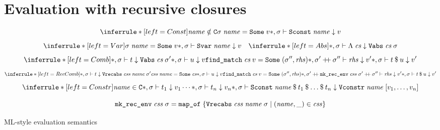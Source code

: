 
\section{Evaluation with recursive closures}
\label{sec:intermediate:ml}

\begin{code}[t]
  \[
    \inferrule*[left=Const]{\mathit{name} \notin \C \\ \sigma\;\mathit{name} = \holconst{Some}\;v}{\seval*{\sigma}{\holconst{Sconst}\;\mathit{name}}{v}}
  \]
  \[
    \inferrule*[left=Var]{\sigma\;\mathit{name} = \holconst{Some}\;v}{\seval*{\sigma}{\holconst{Svar}\;\mathit{name}}{v}} \quad
    \inferrule*[left=Abs]{ }{\seval*\sigma{\Lambda\;\cs}{\holconst{Vabs}\;\cs\;\sigma}}
  \]
  \[
    \inferrule*[left=Comb]{
      \seval*\sigma{t}{\holconst{Vabs}\;\cs\;\sigma'} \\
      \seval*\sigma{u}{v} \\
      \holconst{find\_match}\;\cs\;v = \holconst{Some}\;(\sigma'', \mathit{rhs}) \\
      \seval*{\envadd{\sigma'}{\sigma''}}{\mathit{rhs}}{v'}
    }{\seval*\sigma{\app t u}{v'}}
  \]
  \[
    \inferrule*[left=RecComb]{
      \seval*\sigma{t}{\holconst{Vrecabs}\;\css\;\mathit{name}\;\sigma'} \\
      \css\;\mathit{name} = \holconst{Some}\;\cs \\
      \seval*\sigma{u}{v} \\
      \holconst{find\_match}\;\cs\;v = \holconst{Some}\;(\sigma'', \mathit{rhs}) \\
      \seval*{\envadd{\sigma'}{\envadd{\holconst{mk\_rec\_env}\;\mathit{css}\;\sigma'}{\sigma''}}}{\mathit{rhs}}{v'}
    }{\seval*\sigma{\app t u}{v'}}
  \]
  \[
    \inferrule*[left=Constr]{
      \mathit{name} \in \C \\
      \seval*\sigma{t_1}{v_1} \\
      \cdots \\
      \seval*\sigma{t_n}{v_n}
    }{\seval*\sigma{\holconst{Sconst}\;\mathit{name}\mathbin\$t_1\mathbin\$\ldots\mathbin\$t_n}{\holconst{Vconstr}\;\mathit{name}\;[v_1, \ldots, v_n]}}
  \]

  \[
    \texttt{\textup{mk\_rec\_env}}\;\mathit{css}\;\sigma = \texttt{\textup{map\_of}}\;\{ \texttt{\textup{Vrecabs}}\;\mathit{css}\;\mathit{name}\;\sigma \mid (\mathit{name}, \_) \in \mathit{css} \}
  \]
  \caption{ML-style evaluation semantics}
  \label{code:intermediate:ml}
\end{code}


